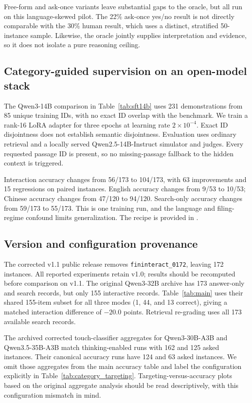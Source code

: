 Free-form and ask-once variants leave substantial gaps to the oracle, but all run on this language-skewed pilot. The 22\% ask-once yes/no result is not directly comparable with the 30\% human result, which uses a distinct, stratified 50-instance sample. Likewise, the oracle jointly supplies interpretation and evidence, so it does not isolate a pure reasoning ceiling.

\subsection{Category-guided supervision on an open-model stack}
The Qwen3-14B comparison in Table~\ref{tab:sft14b} uses 231 demonstrations from 85 unique training IDs, with no exact ID overlap with the benchmark. We train a rank-16 LoRA adapter for three epochs at learning rate $2\times10^{-4}$. Exact ID disjointness does not establish semantic disjointness. Evaluation uses ordinary retrieval and a locally served Qwen2.5-14B-Instruct simulator and judges. Every requested passage ID is present, so no missing-passage fallback to the hidden context is triggered.

Interaction accuracy changes from 56/173 to 104/173, with 63 improvements and 15 regressions on paired instances. English accuracy changes from 9/53 to 10/53; Chinese accuracy changes from 47/120 to 94/120. Search-only accuracy changes from 59/173 to 55/173. This is one training run, and the language and filing-regime confound limits generalization. The recipe is provided in .

\subsection{Version and configuration provenance}
The corrected v1.1 public release removes \texttt{fininteract\_0172}, leaving 172 instances. All reported experiments retain v1.0; results should be recomputed before comparison on v1.1. The original Qwen3-32B archive has 173 answer-only and search records, but only 155 interactive records. Table~\ref{tab:main} uses their shared 155-item subset for all three modes (1, 44, and 13 correct), giving a matched interaction difference of $-20.0$ points. Retrieval re-grading uses all 173 available search records.

The archived corrected touch-classifier aggregates for Qwen3-30B-A3B and Qwen3.5-35B-A3B match thinking-enabled runs with 162 and 125 asked instances. Their canonical accuracy runs have 124 and 63 asked instances. We omit those aggregates from the main accuracy table and label the configuration explicitly in Table~\ref{tab:category_targeting}. Targeting-versus-accuracy plots based on the original aggregate analysis should be read descriptively, with this configuration mismatch in mind.
